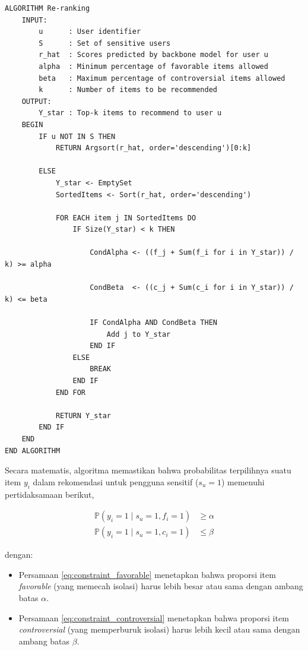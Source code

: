 \begin{minipage}{\textwidth} 
\begin{lstlisting}[frame=lines, captionpos=t, caption={Algoritma Re-ranking}, label={alg:reranking_debiasio_original}]
ALGORITHM Re-ranking
    INPUT:
        u      : User identifier
        S      : Set of sensitive users
        r_hat  : Scores predicted by backbone model for user u
        alpha  : Minimum percentage of favorable items allowed
        beta   : Maximum percentage of controversial items allowed
        k      : Number of items to be recommended
    OUTPUT:
        Y_star : Top-k items to recommend to user u
    BEGIN
        IF u NOT IN S THEN
            RETURN Argsort(r_hat, order='descending')[0:k]
        
        ELSE
            Y_star <- EmptySet
            SortedItems <- Sort(r_hat, order='descending')
            
            FOR EACH item j IN SortedItems DO
                IF Size(Y_star) < k THEN
                    
                    CondAlpha <- ((f_j + Sum(f_i for i in Y_star)) / k) >= alpha
                    
                    CondBeta  <- ((c_j + Sum(c_i for i in Y_star)) / k) <= beta
                    
                    IF CondAlpha AND CondBeta THEN
                        Add j to Y_star
                    END IF
                ELSE
                    BREAK
                END IF
            END FOR
            
            RETURN Y_star
        END IF
    END
END ALGORITHM
\end{lstlisting}
\end{minipage}

Secara matematis, algoritma memastikan bahwa probabilitas terpilihnya
suatu item $y_i$ dalam rekomendasi untuk pengguna sensitif ($s_u=1$) memenuhi
pertidaksamaan berikut,

\begin{align}
    \mathbb{P}(y_i=1 \mid s_u=1, f_i=1) &\geq \alpha \label{eq:constraint_favorable} \\
    \mathbb{P}(y_i=1 \mid s_u=1, c_i=1) &\leq \beta \label{eq:constraint_controversial}
\end{align}

dengan:
\begin{itemize}
    \item Persamaan \eqref{eq:constraint_favorable} menetapkan bahwa proporsi
    item \textit{favorable} (yang memecah isolasi) harus lebih besar atau sama
    dengan ambang batas $\alpha$.
    \item Persamaan \eqref{eq:constraint_controversial} menetapkan bahwa proporsi
    item \textit{controversial} (yang memperburuk isolasi) harus lebih kecil
    atau sama dengan ambang batas $\beta$.
\end{itemize}

